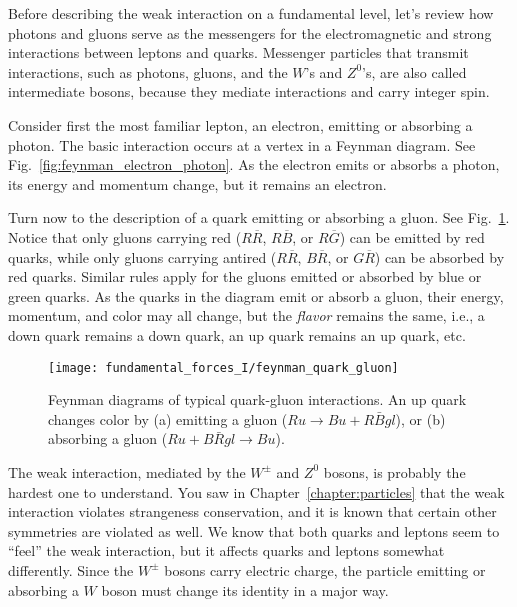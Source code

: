 Before describing the weak interaction on a fundamental level,
let's review how photons and gluons serve as the messengers for
the electromagnetic and strong interactions between leptons and
quarks. Messenger particles that transmit interactions, such as
photons, gluons, and the $W$'s and $Z^0$'s, are also called
intermediate bosons, because they mediate interactions and carry
integer spin.

Consider first the most familiar lepton, an electron, emitting or
absorbing a photon.  The basic interaction occurs at a vertex in a
Feynman diagram.  See Fig.~\ref{fig:feynman_electron_photon}.  As
the electron emits or absorbs a photon, its energy and momentum
change, but it remains an electron.

Turn now to the description of a quark emitting or absorbing a
gluon. See Fig.~\ref{fig:feynman_quark_gluon}.  Notice that only
gluons carrying red ($R\overline R$, $R\overline B$, or
$R\overline G$) can be emitted by red quarks, while only gluons
carrying antired ($R\overline R$, $B\overline R$, or $G\overline
R$) can be absorbed by red quarks.  Similar rules apply for the
gluons emitted or absorbed by blue or green quarks.  As the quarks
in the diagram emit or absorb a gluon, their energy, momentum, and
color may all change, but the {\em flavor} remains the same, i.e.,
a down quark remains a down quark, an up quark remains an up
quark, etc.


\begin{figure}[tbp]
\begin{center}
\begin{minipage}{10cm}
\begin{center}
\texttt{[image: fundamental\_forces\_I/feynman\_quark\_gluon]}
\caption{Feynman diagrams of typical quark-gluon interactions.  An
up quark changes color by (a) emitting a gluon ($Ru \rightarrow
Bu + R\bar{B}gl$), or (b) absorbing a gluon ($Ru + B\bar{R}gl \rightarrow
Bu$).}
\label{fig:feynman_quark_gluon}
\end{center}
\end{minipage}
\end{center}
\end{figure}

The weak interaction, mediated by the $W^\pm$ and $Z^0$ bosons, is
probably the hardest one to understand.  You saw in
Chapter~\ref{chapter:particles} that the weak interaction violates
strange\-ness conservation, and it is known that certain other
symmetries are violated as well.  We know that both quarks and
leptons seem to ``feel'' the weak interaction, but it affects
quarks and leptons somewhat differently.  Since the $W^\pm$ bosons
carry electric charge, the particle emitting or absorbing a $W$
boson must change its identity in a major way.


